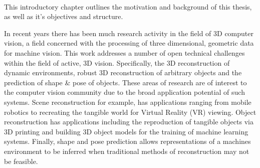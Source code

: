 ~\label{chap:intro}
\begin{chapterabstract}
This introductory chapter outlines the motivation and background of this thesis, as well as it's objectives 
and structure.
\end{chapterabstract}

In recent years there has been much research activity in the field of 3D computer vision, a field concerned 
with the processing of three dimensional, geometric data for machine vision. This work addresses a number of 
open technical challenges within the field of active, 3D vision. Specifically, the 3D reconstruction of 
dynamic environments, robust 3D reconstruction of arbitrary objects and the prediction of shape \& pose of 
objects. These areas of research are of interest to the computer vision community due to the broad application 
potential of such systems. Scene reconstruction for example, has applications ranging from mobile robotics to 
recreating the tangible world for Virtual Reality (VR) viewing. Object reconstruction has applications including 
the reproduction of tangible objects via 3D printing and building 3D object models for the training of machine 
learning systems. Finally, shape and pose prediction allows representations of a machines environment to be 
inferred when traditional methods of reconstruction may not be feasible.

